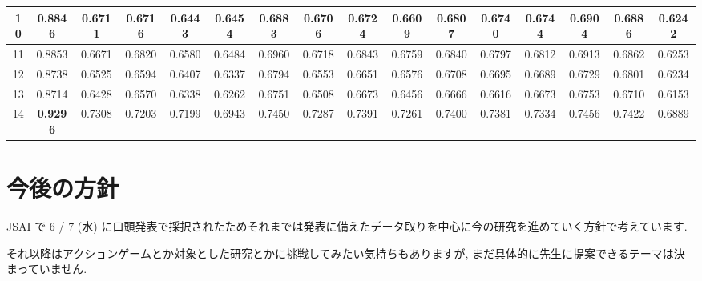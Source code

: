 \documentclass{jarticle}     %
\begin{document}
\begin{table}[t]
{\begin{tabular}{|c|c|c|c|c|c|c|c|c|c|c|c|c|c|c|c|}
        \multicolumn{1}{|c|}{10} & 0.8846 & 0.6711 & 0.6716 & 0.6443 & 0.6454 & 0.6883 & 0.6706 & 0.6724 & 0.6609 & 0.6807 & 0.6740 & 0.6744 & 0.6904 & 0.6886 & 0.6242 \\ \hline
        \multicolumn{1}{|c|}{11} & 0.8853 & 0.6671 & 0.6820 & 0.6580 & 0.6484 & 0.6960 & 0.6718 & 0.6843 & 0.6759 & 0.6840 & 0.6797 & 0.6812 & 0.6913 & 0.6862 & 0.6253 \\ \hline
        \multicolumn{1}{|c|}{12} & 0.8738 & 0.6525 & 0.6594 & 0.6407 & 0.6337 & 0.6794 & 0.6553 & 0.6651 & 0.6576 & 0.6708 & 0.6695 & 0.6689 & 0.6729 & 0.6801 & 0.6234 \\ \hline
        \multicolumn{1}{|c|}{13} & 0.8714 & 0.6428 & 0.6570 & 0.6338 & 0.6262 & 0.6751 & 0.6508 & 0.6673 & 0.6456 & 0.6666 & 0.6616 & 0.6673 & 0.6753 & 0.6710 & 0.6153 \\ \hline
        \multicolumn{1}{|c|}{14} & \textbf{0.9296} & 0.7308 & 0.7203 & 0.7199 & 0.6943 & 0.7450 & 0.7287 & 0.7391 & 0.7261 & 0.7400 & 0.7381 & 0.7334 & 0.7456 & 0.7422 & 0.6889 \\ \hline
        \end{tabular}
    }
      \end{table}

\section{今後の方針}
JSAI で 6 / 7 (水) に口頭発表で採択されたためそれまでは発表に備えたデータ取りを中心に今の研究を進めていく方針で考えています.  
\par
それ以降はアクションゲームとか対象とした研究とかに挑戦してみたい気持ちもありますが, まだ具体的に先生に提案できるテーマは決まっていません.




\end{document}
